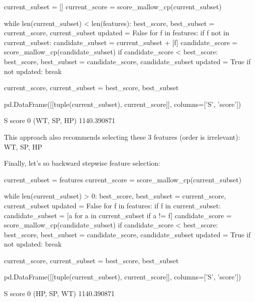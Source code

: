 \begin{python}
current_subset = []
current_score = score_mallow_cp(current_subset)

while len(current_subset) < len(features):
    best_score, best_subset = current_score, current_subset
    updated = False
    for f in features:
        if f not in current_subset:
            candidate_subset = current_subset + [f]
            candidate_score = score_mallow_cp(candidate_subset)
            if candidate_score < best_score:
                best_score, best_subset = candidate_score, candidate_subset
                updated = True              
    if not updated:
        break
        
    current_score, current_subset = best_score, best_subset
    
pd.DataFrame([[tuple(current_subset), current_score]], columns=['S', 'score'])
\end{python}

\begin{console}
              S        score
0  (WT, SP, HP)  1140.390871
\end{console}

This approach also recommends selecting these 3 features (order is
irrelevant): WT, SP, HP

Finally, let's so backward stepwise feature selection:

\begin{python}
current_subset = features
current_score = score_mallow_cp(current_subset)

while len(current_subset) > 0:
    best_score, best_subset = current_score, current_subset
    updated = False
    for f in features:
        if f in current_subset:
            candidate_subset = [a for a in current_subset if a != f]
            candidate_score = score_mallow_cp(candidate_subset)
            if candidate_score < best_score:
                best_score, best_subset = candidate_score, candidate_subset
                updated = True              
    if not updated:
        break
        
    current_score, current_subset = best_score, best_subset
    
pd.DataFrame([[tuple(current_subset), current_score]], columns=['S', 'score'])
\end{python}

\begin{console}
              S        score
0  (HP, SP, WT)  1140.390871
\end{console}

